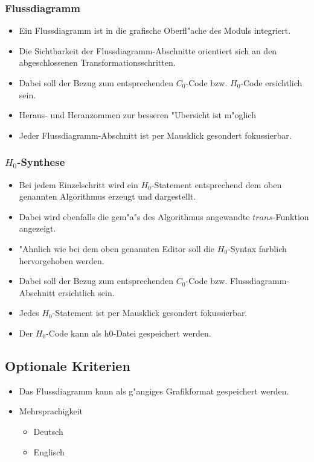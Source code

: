 \begin{itemize}
	\subsubsection{Flussdiagramm}
	\begin{itemize}
    \item Ein Flussdiagramm ist in die grafische Oberfl"ache des Moduls
    integriert.
    \item Die Sichtbarkeit der Flussdiagramm-Abschnitte orientiert sich an den
    abgeschlossenen Transformationsschritten.
    \item Dabei soll der Bezug zum entsprechenden $C_0$-Code bzw. $H_0$-Code
    ersichtlich sein.
		\item Heraus- und Heranzommen zur besseren "Ubersicht ist m"oglich
    \item Jeder Flussdiagramm-Abschnitt ist per Mausklick gesondert
    fokussierbar.
	\end{itemize}
	
	\subsubsection{$H_0$-Synthese}
	\begin{itemize}
    \item Bei jedem Einzelschritt wird ein $H_0$-Statement entsprechend dem
    oben genannten Algorithmus erzeugt und dargestellt.
    \item Dabei wird ebenfalls die gem"a"s des Algorithmus angewandte $trans$-Funktion angezeigt.
    \item "Ahnlich wie bei dem oben genannten Editor soll die $H_0$-Syntax
    farblich hervorgehoben werden.
    \item Dabei soll der Bezug zum entsprechenden $C_0$-Code bzw.
    Flussdiagramm-Abschnitt ersichtlich sein.
    \item Jedes $H_0$-Statement ist per Mausklick gesondert fokussierbar.
    \item Der $H_0$-Code kann als h0-Datei gespeichert werden.
	\end{itemize}
\end{itemize}

\subsection{Optionale Kriterien}
\begin{itemize}
  \item Das Flussdiagramm kann als g"angiges Grafikformat gespeichert
  werden.
	\item Mehrsprachigkeit
  \begin{itemize}
    \item Deutsch
    \item Englisch
  \end{itemize}
\end{itemize}
